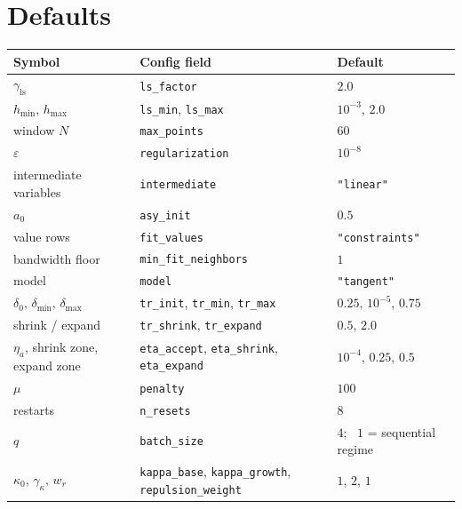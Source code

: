 \documentclass[11pt,a4paper]{article}
\newcommand{\code}[1]{\texttt{#1}}
\begin{document}
\section{Defaults}
\begin{center}
\begin{tabular}{lll}
\toprule
Symbol & Config field & Default \\
\midrule
$\gamma_{\mathrm{ls}}$ & \code{ls\_factor} & $2.0$ \\
$h_{\min},\, h_{\max}$ & \code{ls\_min}, \code{ls\_max} & $10^{-3}$, $2.0$ \\
window $N$ & \code{max\_points} & $60$ \\
$\varepsilon$ & \code{regularization} & $10^{-8}$ \\
intermediate variables & \code{intermediate} & \code{"linear"} \\
$a_0$ & \code{asy\_init} & $0.5$ \\
value rows & \code{fit\_values} & \code{"constraints"} \\
bandwidth floor & \code{min\_fit\_neighbors} & $1$ \\
model & \code{model} & \code{"tangent"} \\
$\delta_0,\, \delta_{\min},\, \delta_{\max}$ & \code{tr\_init}, \code{tr\_min}, \code{tr\_max} & $0.25$, $10^{-5}$, $0.75$ \\
shrink / expand & \code{tr\_shrink}, \code{tr\_expand} & $0.5$, $2.0$ \\
$\eta_a$, shrink zone, expand zone & \code{eta\_accept}, \code{eta\_shrink}, \code{eta\_expand} & $10^{-4}$, $0.25$, $0.5$ \\
$\mu$ & \code{penalty} & $100$ \\
restarts & \code{n\_resets} & $8$ \\
$q$ & \code{batch\_size} & $4$; \ $1$ = sequential regime \\
$\kappa_0,\, \gamma_\kappa,\, w_r$ & \code{kappa\_base}, \code{kappa\_growth}, \code{repulsion\_weight} & $1$, $2$, $1$ \\
\bottomrule
\end{tabular}
\end{center}
\end{document}
